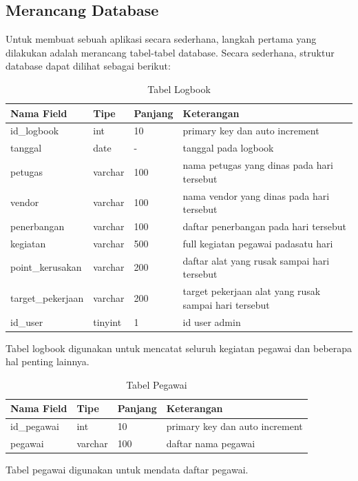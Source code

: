 \subsection{Merancang Database}
Untuk membuat sebuah aplikasi secara sederhana, langkah pertama yang dilakukan adalah merancang tabel-tabel database. Secara sederhana, struktur database dapat dilihat sebagai berikut:
\begin{table}[h]
\caption{Tabel Logbook }
\centering
\begin{tabular}{ |p{2cm}|p{1cm}|p{1cm}|p{5cm}| }
 \hline
 \textbf{Nama Field} & \textbf{Tipe} & \textbf{Panjang} & \textbf{Keterangan}\\
 \hline
id\_logbook & int & 10 & primary key dan auto increment\\
 \hline
tanggal & date & - & tanggal pada logbook\\
 \hline
petugas & varchar & 100 & nama petugas yang dinas pada hari tersebut\\
 \hline
vendor & varchar & 100 & nama vendor yang dinas pada hari tersebut\\
 \hline
penerbangan & varchar & 100 & daftar penerbangan pada hari tersebut\\
 \hline
kegiatan & varchar & 500 & full kegiatan pegawai padasatu hari\\
 \hline
point_kerusakan & varchar & 200 & daftar alat yang rusak sampai hari tersebut\\
 \hline
target_pekerjaan & varchar & 200 & target pekerjaan alat yang rusak sampai hari tersebut\\
 \hline
id\_user & tinyint & 1 & id user admin\\
 \hline
\end{tabular}
\end{table}
Tabel logbook digunakan untuk mencatat seluruh kegiatan pegawai dan beberapa hal penting lainnya.
 \begin{table}[h]
\caption{Tabel Pegawai}
\centering
\begin{tabular}{ |p{2cm}|p{1cm}|p{1cm}|p{5cm}| }
 \hline
 \textbf{Nama Field} & \textbf{Tipe} & \textbf{Panjang} & \textbf{Keterangan}\\
 \hline
id\_pegawai & int & 10 & primary key dan auto increment\\
 \hline
pegawai & varchar & 100 & daftar nama pegawai\\
 \hline
\end{tabular}
\end{table}
Tabel pegawai digunakan untuk mendata daftar pegawai.
